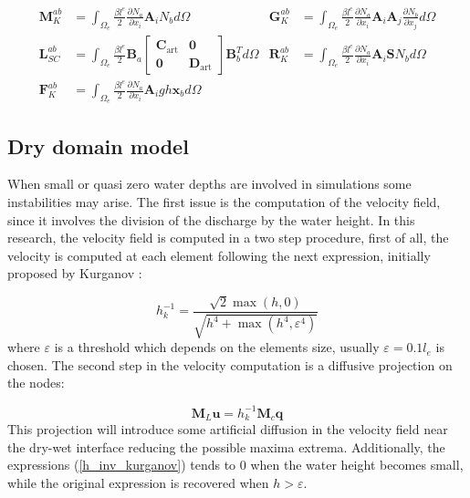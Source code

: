 \documentclass[a4paper,12pt]{article}
\newcommand{\pder}[2]{\frac{\partial#1}{\partial#2}}
\begin{document}
\begin{align}
\displaystyle\mathbf{M}_K^{ab} &= \int_{\Omega_e} \frac{\beta l^e}{2} \pder{N_a}{x_i}\mathbf{A}_i N_b d\Omega &
\displaystyle\mathbf{G}_K^{ab} &= \int_{\Omega_e} \frac{\beta l^e}{2} \pder{N_a}{x_i}\mathbf{A}_i\mathbf{A}_j \pder{N_b}{x_j} d\Omega \nonumber\\
\displaystyle\mathbf{L}_{SC}^{ab} &= \int_{\Omega_e} \frac{\beta l^e}{2} \mathbf{B}_a \left[\begin{matrix}
        \mathbf{C}_\text{art} & \mathbf{0} \\ \mathbf{0} & \mathbf{D}_\text{art}
    \end{matrix}\right] \mathbf{B}_b^T d\Omega &
\displaystyle\mathbf{R}_K^{ab} &= \int_{\Omega_e} \frac{\beta l^e}{2} \pder{N_a}{x_i}\mathbf{A}_i \mathbf{S} N_b d\Omega \\
\displaystyle\mathbf{F}_K^{ab} &= \int_{\Omega_e} \frac{\beta l^e}{2} \pder{N_a}{x_i}\mathbf{A}_i gh\mathbf{x}_b d\Omega
\nonumber
\end{align}


\subsection{Dry domain model}

When small or quasi zero water depths are involved in simulations some instabilities may arise. The first issue is the computation of the velocity field, since it involves the division of the discharge by the water height. In this research, the velocity field is computed in a two step procedure, first of all, the velocity is computed at each element following the next expression, initially proposed by Kurganov \cite{kurganov2007}:

\begin{equation} \label{h_inv_kurganov}
h^{-1}_k = \frac{\sqrt{2}\max(h,0)}{\sqrt{h^4 + \max(h^4, \varepsilon^4)}}
\end{equation}
where $\varepsilon$ is a threshold which depends on the elements size, usually $\varepsilon = 0.1 l_e$ is chosen. The second step in the velocity computation is a diffusive projection on the nodes:

\begin{equation}
\mathbf{M}_L \mathbf{u} = h^{-1}_k \mathbf{M}_c \mathbf{q}
\end{equation}
This projection will introduce some artificial diffusion in the velocity field near the dry-wet interface reducing the possible maxima extrema. Additionally, the expressions (\ref{h_inv_kurganov}) tends to $0$ when the water height becomes small, while the original expression is recovered when $h>\varepsilon$.
\end{document}
